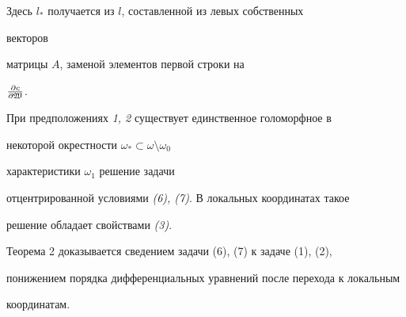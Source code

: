 Здесь $l_*$ получается из $l$, составленной из левых собственных


векторов


матрицы $A$, заменой элементов первой строки на


$\frac{\partial c}{\partial\frak W}$.





\begin{thm}


При предположениях {\em 1, 2} существует единственное голоморфное в


некоторой окрестности $\omega_*\subset\omega\setminus\omega_0$


характеристики $\omega_1$ решение задачи


отцентрированной условиями {\em (6), (7)}. В локальных координатах такое


решение обладает свойствами {\em (3)}.


\end{thm}





Теорема 2 доказывается сведением задачи (6), (7) к задаче (1), (2),


понижением порядка дифференциальных уравнений после перехода к локальным


координатам.









